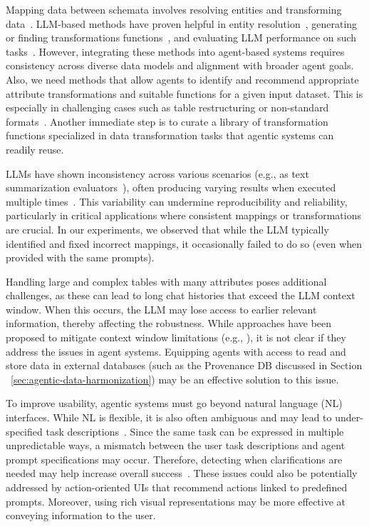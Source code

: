 Mapping data between schemata involves resolving entities and transforming data~\cite{dataexchange2018}. LLM-based methods have proven helpful in entity resolution~\cite{narayan-vldb2022, fan2024cost}, generating or finding transformations functions~\cite{zdnet-github-copilot, trummer2022codexdb,autotables2023, autoformula2024, dtt2024, SheetAgent2024}, and evaluating LLM performance on such tasks~\cite{ma2024spreadsheetbench}.
However, integrating these methods into agent-based systems requires consistency across diverse data models and alignment with broader agent goals.
Also, we need methods that allow agents to identify and recommend appropriate attribute transformations and suitable functions for a given input dataset. This is especially in challenging cases such as table restructuring or non-standard formats~\cite{autotables2023}.
Another immediate step is to curate a library of transformation functions specialized in data transformation tasks that agentic systems can readily reuse.


LLMs have shown inconsistency across various scenarios (e.g., as text summarization evaluators~\cite{stureborg2024large}), often producing varying results when executed multiple times~\cite{barrie2024prompt}. This variability can undermine reproducibility and reliability, particularly in critical applications where consistent mappings or transformations are crucial. In our experiments, we observed that while the LLM typically identified and fixed incorrect mappings, it occasionally failed to do so (even when provided with the same prompts).

Handling large and complex tables with many attributes poses additional challenges, as these can lead to long chat histories that exceed the LLM context window. When this occurs, the LLM may lose access to earlier relevant information, thereby affecting the robustness. While approaches have been proposed to mitigate context window limitations (e.g., \cite{jin2024llm} \cite{ma2024megalodon}), 
it is not clear if they address the issues in agent systems. 
Equipping agents with access to read and store data in external databases (such as the Provenance DB discussed in Section ~\ref{sec:agentic-data-harmonization}) may be an effective solution to this issue.

 To improve usability, agentic systems must go beyond natural language (NL) interfaces. While NL is flexible, it is also often ambiguous and may lead to under-specified task descriptions~\cite{zhang2023clarify}. 
Since the same task can be expressed in multiple unpredictable ways, a mismatch between the user task descriptions and agent prompt specifications may occur. Therefore, detecting when clarifications are needed may help increase overall success~\cite{zhang2023clarify}.
These issues could also be potentially addressed by action-oriented UIs that recommend actions linked to predefined prompts. Moreover, using rich visual representations may be more effective at conveying information to the user.

